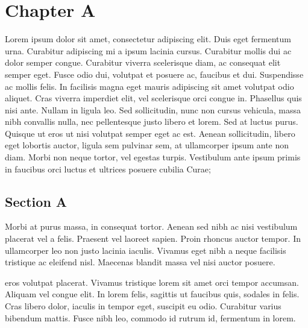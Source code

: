 \chapter{Chapter A}

Lorem ipsum dolor sit amet, consectetur adipiscing elit. Duis eget fermentum urna. Curabitur adipiscing mi a ipsum lacinia cursus. Curabitur mollis dui ac dolor semper congue. Curabitur viverra scelerisque diam, ac consequat elit semper eget. Fusce odio dui, volutpat et posuere ac, faucibus et dui. Suspendisse ac mollis felis. In facilisis magna eget mauris adipiscing sit amet volutpat odio aliquet. Cras viverra imperdiet elit, vel scelerisque orci congue in. Phasellus quis nisi ante. Nullam in ligula leo. Sed sollicitudin, nunc non cursus vehicula, massa nibh convallis nulla, nec pellentesque justo libero et lorem. Sed at luctus purus. Quisque ut eros ut nisi volutpat semper eget ac est. Aenean sollicitudin, libero eget lobortis auctor, ligula sem pulvinar sem, at ullamcorper ipsum ante non diam. Morbi non neque tortor, vel egestas turpis. Vestibulum ante ipsum primis in faucibus orci luctus et ultrices posuere cubilia Curae;

\section{Section A}
Morbi at purus massa, in consequat tortor. Aenean sed nibh ac nisi vestibulum placerat vel a felis. Praesent vel laoreet sapien. Proin rhoncus auctor tempor. In ullamcorper leo non justo lacinia iaculis. Vivamus eget nibh a neque facilisis tristique ac eleifend nisl. Maecenas blandit massa vel nisi auctor posuere.

eros volutpat placerat. Vivamus tristique lorem sit amet orci tempor accumsan. Aliquam vel congue elit. In lorem felis, sagittis ut faucibus quis, sodales in felis. Cras libero dolor, iaculis in tempor eget, suscipit eu odio. Curabitur varius bibendum mattis. Fusce nibh leo, commodo id rutrum id, fermentum in lorem. 